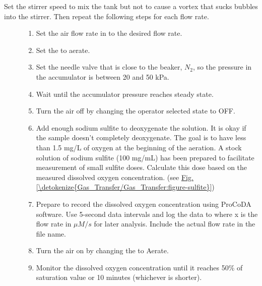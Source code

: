 \documentclass[letterpaper,10pt,english]{sphinxmanual}
\begin{document}
\begin{description}
\item[{Set the stirrer speed to mix the tank but not to cause a vortex that sucks bubbles into the stirrer. Then repeat the following steps for each flow rate.}] \leavevmode\begin{enumerate}
\item {} 
Set the air flow rate in  to the desired flow rate.

\item {} 
Set the  to aerate.

\item {} 
Set the needle valve that is close to the beaker, \(N_2\), so the pressure in the accumulator is between 20 and 50 kPa.

\item {} 
Wait until the accumulator pressure reaches steady state.

\item {} 
Turn the air off by changing the operator selected state to OFF.

\item {} 
Add enough sodium sulfite to deoxygenate the solution. It is okay if the sample doesn’t completely deoxygenate. The goal is to have less than 1.5 mg/L of oxygen at the beginning of the aeration. A stock solution of sodium sulfite (100 mg/mL) has been prepared to facilitate measurement of small sulfite doses. Calculate this dose based on the measured dissolved oxygen concentration. (see \hyperref[\detokenize{Gas_Transfer/Gas_Transfer:figure-sulfite}]{Fig.\@ \ref{\detokenize{Gas_Transfer/Gas_Transfer:figure-sulfite}}})

\item {} 
Prepare to record the dissolved oxygen concentration using ProCoDA software. Use 5-second data intervals and log the data to  where x is the flow rate in \(\mu M/s\) for later analysis. Include the actual flow rate in the file name.

\item {} 
Turn the air on by changing the  to Aerate.

\item {} 
Monitor the dissolved oxygen concentration until it reaches 50\% of saturation value or 10 minutes (whichever is shorter).


\end{enumerate}
\end{description}
\end{document}
